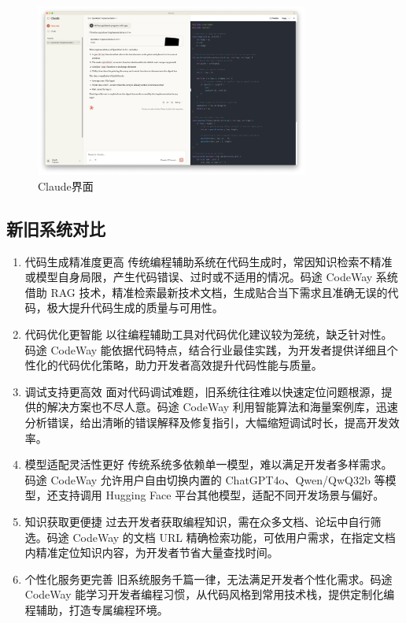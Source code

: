\documentclass[
    report,     %
    oneside,    %
    UTF8,       %
    zihao=-4    %
]{config} %
\begin{document}
\begin{enumerate}[label=(\arabic*)]
\begin{figure}[h]
    \centering %
    \includegraphics[width=0.8\textwidth]{figures/claude.pdf}
    \caption{Claude界面} %
    \label{fig:Claude} %
\end{figure}
\end{enumerate}
\subsection{新旧系统对比}
\begin{enumerate}[label=(\arabic*)]
    \item 代码生成精准度更高
传统编程辅助系统在代码生成时，常因知识检索不精准或模型自身局限，产生代码错误、过时或不适用的情况。码途 CodeWay 系统借助 RAG 技术，精准检索最新技术文档，生成贴合当下需求且准确无误的代码，极大提升代码生成的质量与可用性。
    \item 代码优化更智能
以往编程辅助工具对代码优化建议较为笼统，缺乏针对性。码途 CodeWay 能依据代码特点，结合行业最佳实践，为开发者提供详细且个性化的代码优化策略，助力开发者高效提升代码性能与质量。
    \item 调试支持更高效
面对代码调试难题，旧系统往往难以快速定位问题根源，提供的解决方案也不尽人意。码途 CodeWay 利用智能算法和海量案例库，迅速分析错误，给出清晰的错误解释及修复指引，大幅缩短调试时长，提高开发效率。
    \item 模型适配灵活性更好
传统系统多依赖单一模型，难以满足开发者多样需求。码途 CodeWay 允许用户自由切换内置的 ChatGPT4o、Qwen/QwQ32b 等模型，还支持调用 Hugging Face 平台其他模型，适配不同开发场景与偏好。
    \item 知识获取更便捷
过去开发者获取编程知识，需在众多文档、论坛中自行筛选。码途 CodeWay 的文档 URL 精确检索功能，可依用户需求，在指定文档内精准定位知识内容，为开发者节省大量查找时间。
    \item 个性化服务更完善
旧系统服务千篇一律，无法满足开发者个性化需求。码途 CodeWay 能学习开发者编程习惯，从代码风格到常用技术栈，提供定制化编程辅助，打造专属编程环境。
\end{enumerate}
\end{document}
